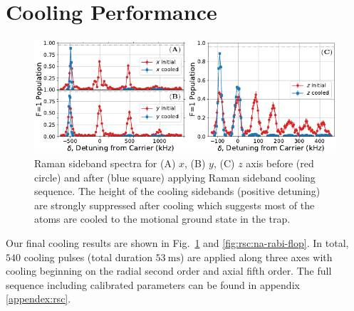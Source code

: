 \section{Cooling Performance}
\begin{figure}
  \centering
  \includegraphics[width=\textwidth]{figures/na_rsc_spectrum.pdf}
  \caption[Raman sideband spectra before and after cooling]{
    Raman sideband spectra for (A) $x$, (B) $y$, (C) $z$ axis before (red circle)
    and after (blue square) applying Raman sideband cooling sequence.
    The height of the cooling sidebands (positive detuning)
    are strongly suppressed after cooling which suggests most of the atoms are cooled
    to the motional ground state in the trap.
    \label{fig:rsc:na-spectrum}}
\end{figure}

Our final cooling results are shown in Fig.~\ref{fig:rsc:na-spectrum} and
\ref{fig:rsc:na-rabi-flop}.
In total, $540$ cooling pulses (total duration $53~\mathrm{ms}$) are applied
along three axes with cooling beginning on the radial second order and axial fifth order.
The full sequence including calibrated parameters can be found in appendix \ref{appendex:rsc}.

